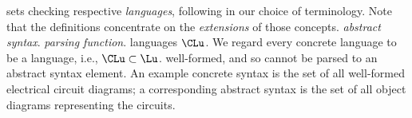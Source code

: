 sets 
checking 
respective 
% 
\emph{languages}, following \cite{} in our choice of terminology. Note that the 
definitions concentrate on the \emph{extensions} of those concepts.
% 
\emph{abstract syntax}. 
\emph{parsing function}.
languages $\CLu$. We regard every concrete language to be a language, i.e., 
$\CLu\subset\Lu$.
well-formed, and so cannot be parsed to an abstract syntax element. An example 
concrete syntax is the set of all well-formed electrical circuit diagrams; a 
corresponding abstract syntax is the set of all object diagrams representing the 
circuits.
